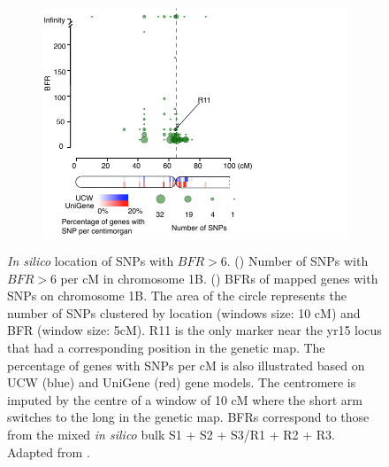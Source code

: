\begin{figure}
  \begin{subfigure}{0.8\textwidth}
  \caption{}
   \label{fig:yr15:BFRValues1BS}
   \includegraphics[width=1\textwidth]{Yr15/Figures/mapping/BFRValues1BS.pdf}
  \end{subfigure}
\caption[\textit{In silico} location of SNPs with BFR\textgreater6]{\textit{In silico} location of SNPs with $BFR>6$. () Number of SNPs with $BFR>6$ per cM in chromosome 1B. () BFRs of mapped genes with SNPs on chromosome 1B. The area of the circle represents the number of SNPs clustered by location (windows size: 10 cM) and BFR (window size: 5cM). R11 is the only marker near the \acrshort{yr15} locus that had a corresponding position in the genetic map. The percentage of genes with SNPs per cM is also illustrated based on UCW (blue) and UniGene (red) gene models. The centromere is imputed by the centre of a window of 10 cM where the short arm switches to the long in the genetic map. BFRs correspond to those from the mixed \textit{in silico} bulk S1 + S2 + S3/R1 + R2 + R3. Adapted from \citep{Ramirez-Gonzalez2015b}.} 
\label{fig:yr15:chr1}
\end{figure}

